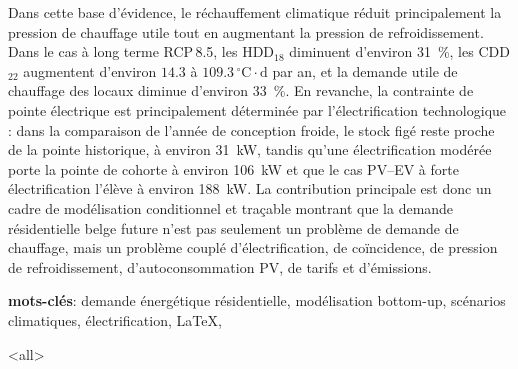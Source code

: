 \newline Dans cette base d’évidence, le réchauffement climatique réduit principalement la pression de chauffage utile tout en augmentant la pression de refroidissement. Dans le cas à long terme RCP\,8.5, les HDD$_{18}$ diminuent d’environ \SI{31}{\percent}, les CDD$_{22}$ augmentent d’environ $14.3$ à $109.3\,^{\circ}\mathrm{C}\cdot\mathrm{d}$ par an, et la demande utile de chauffage des locaux diminue d’environ \SI{33}{\percent}. En revanche, la contrainte de pointe électrique est principalement déterminée par l’électrification technologique : dans la comparaison de l’année de conception froide, le stock figé reste proche de la pointe historique, à environ \SI{31}{kW}, tandis qu’une électrification modérée porte la pointe de cohorte à environ \SI{106}{kW} et que le cas PV--EV à forte électrification l’élève à environ \SI{188}{kW}. La contribution principale est donc un cadre de modélisation conditionnel et traçable montrant que la demande résidentielle belge future n’est pas seulement un problème de demande de chauffage, mais un problème couplé d’électrification, de coïncidence, de pression de refroidissement, d’autoconsommation PV, de tarifs et d’émissions.

\bigskip
\textbf{mots-clés}: demande énergétique résidentielle, modélisation bottom-up, scénarios climatiques, électrification, \LaTeX, \TikZ


\mode<all> %

